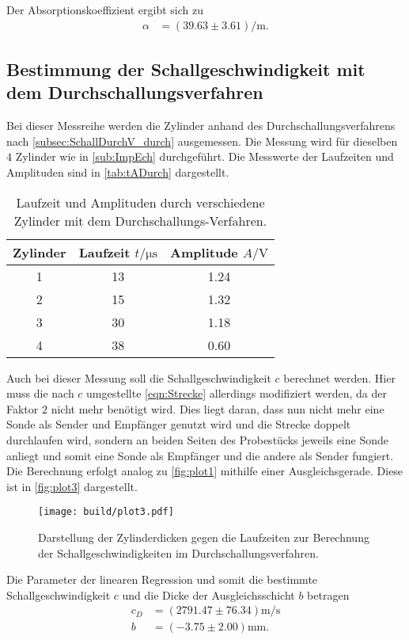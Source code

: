 Der Absorptionskoeffizient ergibt sich zu
\begin{align*}
  \alpha &=( 39.63\pm 3.61) \si{\per\meter}.
\end{align*}

\subsection{Bestimmung der Schallgeschwindigkeit mit dem Durchschallungsverfahren}
\label{subsec:SchallDurchV}

Bei dieser Messreihe werden die Zylinder anhand des Durchschallungsverfahrens nach \autoref{subsec:SchallDurchV_durch} ausgemessen.
Die Messung wird für dieselben $4$ Zylinder wie in \autoref{sub:ImpEch} durchgeführt.
Die Messwerte der Laufzeiten und Amplituden sind in \autoref{tab:tADurch} dargestellt.

\begin{table}[H]
  \centering
  \caption{Laufzeit und Amplituden durch verschiedene Zylinder mit dem Durchschallungs-Verfahren.}
  \label{tab:tADurch}
  \begin{tabular}{S[table-format=1.0] S[table-format=2.0] S[table-format=1.2] }
  \toprule
  {Zylinder} & {Laufzeit $t / \si{\micro\second}$} &  {Amplitude $A / \si{\volt}$}\\
   &  13  & 1.24  \\
  2 &  15  & 1.32  \\
  3 &  30  & 1.18  \\
  4 &  38  & 0.60  \\
  \bottomrule
  \end{tabular}
\end{table}

Auch bei dieser Messung soll die Schallgeschwindigkeit $c$ berechnet werden.
Hier muss die nach $c$ umgestellte \autoref{eqn:Strecke} allerdings modifiziert werden, da der Faktor $2$ nicht mehr benötigt wird.
Dies liegt daran, dass nun nicht mehr eine Sonde als Sender und Empfänger genutzt wird und die Strecke doppelt durchlaufen wird, 
sondern an beiden Seiten des Probestücks jeweils eine Sonde anliegt und somit eine Sonde als Empfänger und die andere als Sender fungiert.
Die Berechnung erfolgt analog zu \autoref{fig:plot1} mithilfe einer Ausgleichsgerade. Diese ist in \autoref{fig:plot3} dargestellt.
\begin{figure}[H]
  \centering
  \texttt{[image: build/plot3.pdf]}
  \caption {Darstellung der Zylinderdicken gegen die Laufzeiten zur Berechnung der Schallgeschwindigkeiten im Durchschallungsverfahren.}
  \label{fig:plot3}
\end{figure}
Die Parameter der linearen Regression und somit die bestimmte Schallgeschwindigkeit $c$ und die Dicke der Ausgleichsschicht $b$ betragen
\begin{align*}
  c_{D}& =( 2791.47\pm 76.34 ) \si{\meter\per\second}\\
  b &= (-3.75\pm 2.00) \si{\milli\meter}.
\end{align*}



